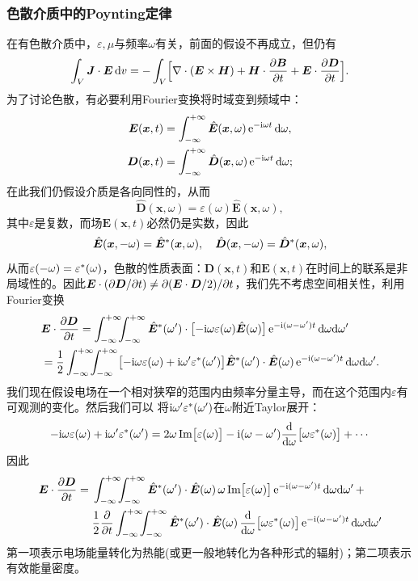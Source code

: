 \subsubsection{色散介质中的Poynting定律}
\label{sssec:Poynting in dissipative media}
在有色散介质中，$\varepsilon,\mu$与频率$\omega$有关，前面的假设不再成立，但仍有
\[
    \int_V\bm J\cdot\bm E\d v=-\int_V\Bigfkh{\div(\bm E\times\bm H)+\bm H\cdot\pv{\bm B}t+\bm E\cdot\pv{\bm D}t}.
\]
为了讨论色散，有必要利用Fourier变换将时域变到频域中：
\begin{align*}
    \bm E(\bm x,t)&=\int_{-\infty}^{+\infty}\hat{\bm E}(\bm x,\omega)\mathop{}\!\mathrm{e}^{-\mathrm{i}\omega t}\mathop{}\!\mathrm{d}\omega,\\
    \bm D(\bm x,t)&=\int_{-\infty}^{+\infty}\hat{\bm D}(\bm x,\omega)\mathop{}\!\mathrm{e}^{-\mathrm{i}\omega t}\mathop{}\!\mathrm{d}\omega;
\end{align*}
在此我们仍假设介质是各向同性的，从而
\[
    \hat{\bm D}(\bm x,\omega)=\varepsilon(\omega)\hat{\bm E}(\bm x,\omega),
\]
其中$\varepsilon$是复数，而场$\bm E(\bm x,t)$必然仍是实数，因此%
\[
    \hat{\bm E}(\bm x,-\omega)=\hat{\bm E}^\ast(\bm x,\omega),\quad\hat{\bm D}(\bm x,-\omega)=\hat{\bm D}^\ast(\bm x,\omega),
\]
从而$\varepsilon(-\omega)=\varepsilon^\ast(\omega)$，色散的性质表面：$\bm D(\bm x,t)$和$\bm E(\bm x,t)$在时间上的联系是非局域性的。因此$\bm E\cdot(\partial\bm D/\partial t)\neq\partial(\bm E\cdot\bm D/2)/\partial t$，我们先不考虑空间相关性，利用Fourier变换
\begin{align*}
    &\bm E\cdot\pv{\bm D}t=\int\iti\bs5\int\iti\hat{\bm E}\cj(\omega')\cdot\bigfkh{-\i\omega\varepsilon(\omega)\hat{\bm E}(\omega)}\e{-\i(\omega-\omega')t}\d\omega\nd\omega'\\
    &=\frac12\int\iti\bs5\int\iti\bigfkh{-\i\omega\varepsilon(\omega)+\i\omega'\varepsilon\cj(\omega')}\hat{\bm E}\cj(\omega')\cdot\hat{\bm E}(\omega)\e{-\i(\omega-\omega')t}\d\omega\nd\omega'.
\end{align*}
我们现在假设电场在一个相对狭窄的范围内由频率分量主导，而在这个范围内$\varepsilon$有可观测的变化。然后我们可以%
将$\mathrm{i}\omega'\varepsilon^\ast(\omega')$在$\omega$附近Taylor展开：
\[
    -\mathrm{i}\omega\varepsilon(\omega)+\mathrm{i}\omega'\varepsilon^\ast(\omega')=2\omega\operatorname{Im}\bigl[\varepsilon(\omega)\bigr]-\mathrm{i}(\omega-\omega')\frac{\mathrm{d}^{\;\!\!}}{\mathrm{d} \omega^{\;\!\!}}\bigl[\omega\varepsilon^\ast(\omega)\bigr]+\cdots
\]
因此 
\begin{align*}
    \bm E\cdot\pv{\bm D}t={}&\int\iti\bs5\int\iti\hat{\bm E}\cj(\omega')\cdot\hat{\bm E}(\omega)\,\omega\Im\bigfkh{\varepsilon(\omega)}\e{-\i(\omega-\omega')t}\d\omega\nd\omega'\,+\\
    &\frac12\pp t\int\iti\bs5\int\iti\hat{\bm E}\cj(\omega')\cdot\hat{\bm E}(\omega)\,\dd\omega\bigfkh{\omega\varepsilon\cj(\omega)}\e{-\i(\omega-\omega')t}\d\omega\nd\omega'
\end{align*}
第一项表示电场能量转化为热能(或更一般地转化为各种形式的辐射)；第二项表示有效能量密度。

